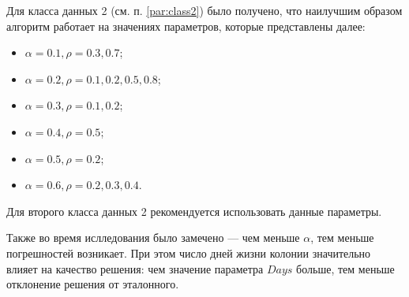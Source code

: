 Для класса данных 2 (см. п. \ref{par:class2}) было получено, что наилучшим образом алгоритм работает на значениях параметров, которые представлены далее:
\begin{itemize}[label=---]
	\item $\alpha = 0.1, \rho = 0.3, 0.7$;
	\item $\alpha = 0.2, \rho = 0.1, 0.2, 0.5, 0.8$;
	\item $\alpha = 0.3, \rho = 0.1, 0.2$;
	\item $\alpha = 0.4, \rho = 0.5$;
	\item $\alpha = 0.5, \rho = 0.2$;
	\item $\alpha = 0.6, \rho = 0.2, 0.3, 0.4$.
\end{itemize} 
Для второго класса данных 2 рекомендуется использовать данные параметры.

Также во время ислледования было замечено --- чем меньше $\alpha$, тем меньше погрешностей возникает. При этом число дней жизни колонии значительно влияет на качество решения: чем значение параметра $Days$ больше, тем меньше отклонение решения от эталонного.